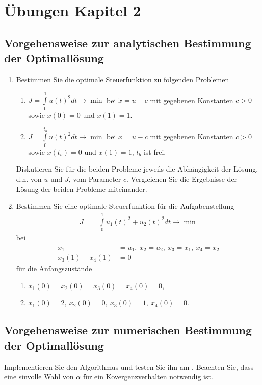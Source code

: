 \section*{Übungen Kapitel 2}
\label{sec:uebung_kapitel_2}

\subsection*{Vorgehensweise zur analytischen Bestimmung der Optimallösung}
\label{sec:uebung_anal_best_opt_lsg}
\begin{enumerate}
  \item Bestimmen Sie die optimale Steuerfunktion zu folgenden Problemen
  \begin{enumerate}
    \item $J = \int\limits_0^1 u(t)^2dt\rightarrow\min$ bei $\dot{x}=u-c$ mit gegebenen Konstanten $c>0$ sowie $x(0)=0$ und $x(1)=1$.
    \item $J = \int\limits_0^{t_b} u(t)^2dt\rightarrow\min$ bei $\dot{x}=u-c$ mit gegebenen Konstanten $c>0$ sowie $x(t_b)=0$ und $x(1)=1$, $t_b$ ist
    frei.
  \end{enumerate}
  Diskutieren Sie für die beiden Probleme jeweils die Abhängigkeit der Lösung, d.h. von $u$ und $J$, vom Parameter $c$. Vergleichen Sie die Ergebnisse
  der Lösung der beiden Probleme miteinander. 
  \item Bestimmen Sie eine optimale Steuerfunktion für die Aufgabenstellung
  \begin{align*}
  	J & = \int\limits_0^1 u_1(t)^2+u_2(t)^2 dt\rightarrow\min
  \end{align*} 
  bei
  \begin{align*}
  	\dot{x}_1 & = u_1,\ \dot{x}_2=u_2,\ \dot{x}_3=x_1,\ \dot{x}_4=x_2\\
  	x_3(1)-x_4(1) & = 0
  \end{align*}
  für die Anfangszustände
  \begin{enumerate}
    \item $x_1(0) = x_2(0)=x_3(0)=x_4(0)=0$,
    \item $x_1(0) = 2,\ x_2(0)=0,\ x_3(0)=1,\ x_4(0)=0$.
  \end{enumerate}
\end{enumerate}

\subsection*{Vorgehensweise zur numerischen Bestimmung der Optimallösung}
\label{sec:uebung_num_best_opt_lsg}
Implementieren Sie den Algorithmus und testen Sie ihn am . Beachten Sie, dass eine
sinvolle Wahl von $\alpha$ für ein Kovergenzverhalten notwendig ist.
